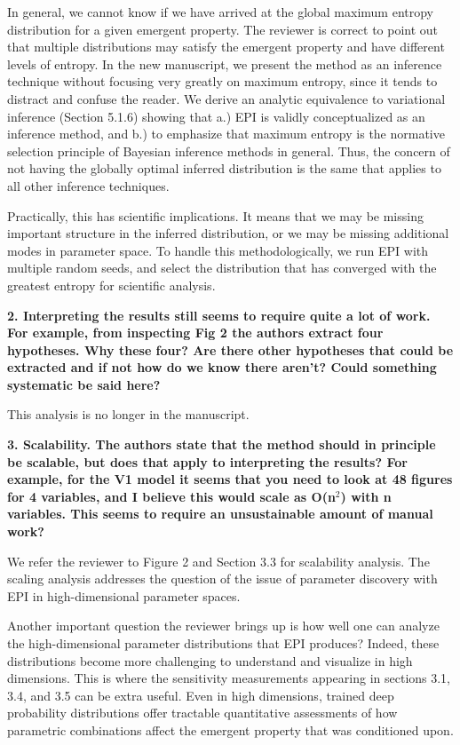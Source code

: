 \documentclass[11pt,a4paper]{article}
\begin{document}
In general, we cannot know if we have arrived at the global maximum entropy distribution for a given emergent property.  The reviewer is correct to point out that multiple distributions may satisfy the emergent property and have different levels of entropy.  In the new manuscript, we present the method as an inference technique without focusing very greatly on maximum entropy, since it tends to distract and confuse the reader.  We derive an analytic equivalence to variational inference (Section 5.1.6) showing that a.) EPI is validly conceptualized as an inference method, and b.) to emphasize that maximum entropy is the normative selection principle of Bayesian inference methods in general. Thus, the concern of not having the globally optimal inferred distribution is the same that applies to all other inference techniques.

Practically, this has scientific implications.  It means that we may be missing important structure in the inferred distribution, or we may be missing additional modes in parameter space.  To handle this methodologically, we run EPI with multiple random seeds, and select the distribution that has converged with the greatest entropy for scientific analysis.

\textbf{2. Interpreting the results still seems to require quite a lot of work. For example, from inspecting Fig 2 the authors extract four hypotheses. Why these four? Are there other hypotheses that could be extracted and if not how do we know there aren't? Could something systematic be said here? }

This analysis is no longer in the manuscript.

\textbf{3. Scalability. The authors state that the method should in principle be scalable, but does that apply to interpreting the results? For example, for the V1 model it seems that you need to look at 48 figures for 4 variables, and I believe this would scale as O(n$^2$) with n variables. This seems to require an unsustainable amount of manual work?}

We refer the reviewer to Figure 2 and Section 3.3 for scalability analysis.  The scaling analysis addresses the question of the issue of parameter discovery with EPI in high-dimensional parameter spaces.

Another important question the reviewer brings up is how well one can analyze the high-dimensional parameter distributions that EPI produces?  Indeed, these distributions become more challenging to understand and visualize in high dimensions.  This is where the sensitivity measurements appearing in sections 3.1, 3.4, and 3.5 can be extra useful.  Even in high dimensions, trained deep probability distributions offer tractable quantitative assessments of how parametric combinations affect the emergent property that was conditioned upon.
\end{document}
